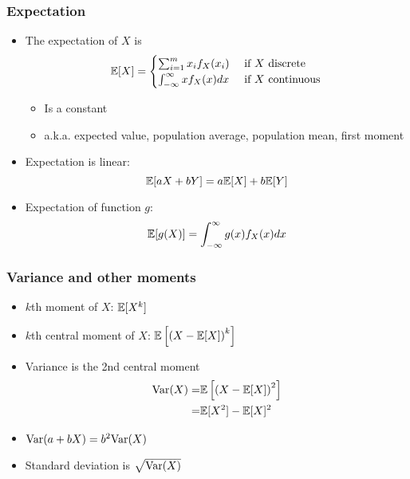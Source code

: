 \begin{frame}\frametitle{Expectation}
  \begin{itemize}
  \item The \alert{expectation} of $X$ is
    \[ 
    \mathbb{E}[X] = \begin{cases} \sum_{i=1}^m x_i f_X(x_i) & \text{ if $X$
        discrete}  \\
      \int_{-\infty}^\infty x f_X(x) dx & \text{ if $X$
        continuous}
    \end{cases}
    \]  
    \begin{itemize}
    \item Is a constant
    \item a.k.a. expected value, population average, population mean,
      first moment
    \end{itemize}
  \item Expectation is linear:
    \[ \mathbb{E}[a X + b Y] = a \mathbb{E}[X] + b \mathbb{E}[Y] \]
  \item Expectation of function $g$:
    \[ \mathbb{E}[g(X) ] = \int_{-\infty}^\infty g(x) f_X(x) dx \]
  \end{itemize}
\end{frame}

\begin{frame} \frametitle{Variance and other moments}
  \begin{itemize}
  \item \alert{$k$th moment} of $X$: $\mathbb{E}[X^k]$
  \item \alert{$k$th central moment} of $X$: $\mathbb{E}\left[\left(X -
        \mathbb{E}[X]\right)^k\right]$ 
  \item \alert{Variance} is the 2nd central moment
    \begin{align*}
      \mathrm{Var}(X) = & \mathbb{E}\left[ \left(X - \mathbb{E}[X]\right)^2 \right] \\
      = & \mathbb{E}[X^2] - \mathbb{E}[X]^2
    \end{align*}
  \item $\mathrm{Var}(a + b X) = b^2 \mathrm{Var}(X)$
  \item \alert{Standard deviation} is $\sqrt{\mathrm{Var}(X)}$
  \end{itemize}
\end{frame}

